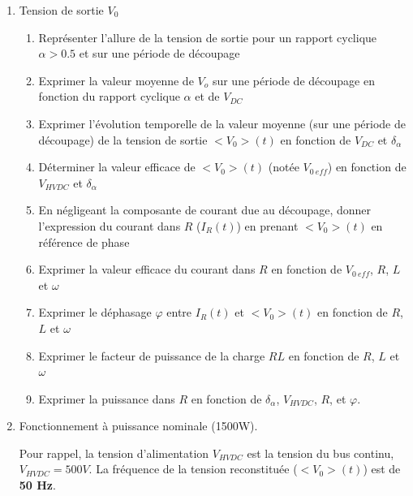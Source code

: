 \begin{enumerate}
%

\item Tension de sortie $V_0$

\begin{enumerate}
\item Représenter l’allure de la tension de sortie pour un rapport cyclique $\alpha > 0.5$ et sur une période de découpage
\item Exprimer la valeur moyenne de $V_o$ sur une période de découpage en fonction du rapport cyclique $\alpha$ et de $V_{DC}$
\item Exprimer l'évolution temporelle de la valeur moyenne (sur une période de découpage) de la tension de sortie \hbox{$<V_0>(t)$} en fonction de $V_{DC}$ et $\delta_\alpha$
\item Déterminer la valeur efficace de $<V_0>(t)$ (notée $V_{0\ eff}$) en fonction de $V_{HVDC}$ et $\delta_\alpha$
\item En négligeant la composante de courant due au découpage, donner l’expression du courant dans $R$ ($I_R(t)$) en prenant $<V_0>(t)$ en référence de phase
\item Exprimer la valeur efficace du courant dans $R$ en fonction de $V_{0\ eff}$, $R$, $L$ et $\omega$
\item Exprimer le déphasage $\varphi$ entre $I_R(t)$ et $<V_0>(t)$ en fonction de $R$, $L$ et $\omega$
\item Exprimer le facteur de puissance de la charge $RL$ en fonction de $R$, $L$ et $\omega$
\item Exprimer la puissance dans $R$ en fonction de $\delta_\alpha$, $V_{HVDC}$, $R$, et $\varphi$.
\end{enumerate}
\item Fonctionnement à puissance nominale (1500W).

Pour rappel, la tension d’alimentation $V_{HVDC}$ est la tension du bus continu, $V_{HVDC}=500 V$. La fréquence de la tension reconstituée ($<V_0>(t)$) est de \textbf{50 Hz}.


\end{enumerate}
